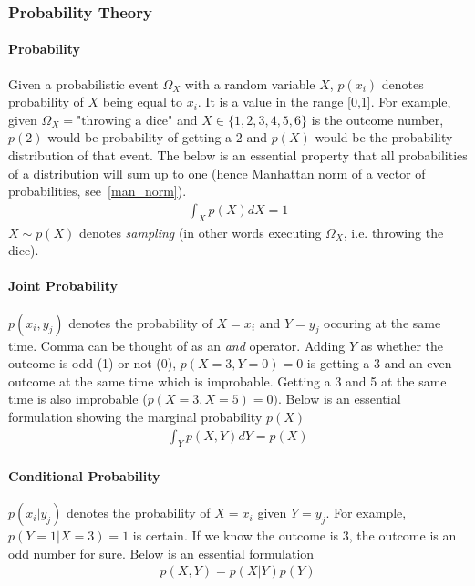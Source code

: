 \documentclass{article}
\numberwithin{equation}{subsection}
\begin{document}
\subsubsection{Probability Theory}
\paragraph{Probability}
Given a probabilistic event $\Omega_X$ with a random variable $X$, $p(x_i)$ denotes probability of $X$ being equal to $x_i$. It is a value in the range [0,1]. For example, given $\Omega_X=\text{"throwing a dice"}$ and $X \in \{1,2,3,4,5,6\}$ is the outcome number, $p(2)$ would be probability of getting a $2$ and $p(X)$ would be the probability distribution of that event. The below is an essential property that all probabilities of a distribution will sum up to one (hence Manhattan norm of a vector of probabilities, see~\ref{man_norm}).
\begin{align}
    \int_X p(X)dX = 1
\end{align}
$X \sim p(X)$ denotes \textit{sampling} (in other words executing $\Omega_X$, i.e. throwing the dice).
\paragraph{Joint Probability}
$p(x_i, y_j)$ denotes the probability of $X=x_i$ and $Y=y_j$ occuring at the same time. Comma can be thought of as an \textit{and} operator. Adding $Y$ as whether the outcome is odd (1) or not (0), $p(X=3,Y=0)=0$ is getting a 3 and an even outcome at the same time which is improbable. Getting a 3 and 5 at the same time is also improbable ($p(X=3,X=5)=0)$. Below is an essential formulation showing the marginal probability $p(X)$
\begin{align}
    \int_Y p(X,Y)dY = p(X)
\end{align}
\paragraph{Conditional Probability}
$p(x_i|y_j)$ denotes the probability of $X=x_i$ given $Y=y_j$. For example, $p(Y=1|X=3)=1$ is certain. If we know the outcome is 3, the outcome is an odd number for sure. Below is an essential formulation
\begin{align}
    p(X,Y) = p(X|Y)p(Y)
    \label{joint_cond_prob}
\end{align}
\end{document}
